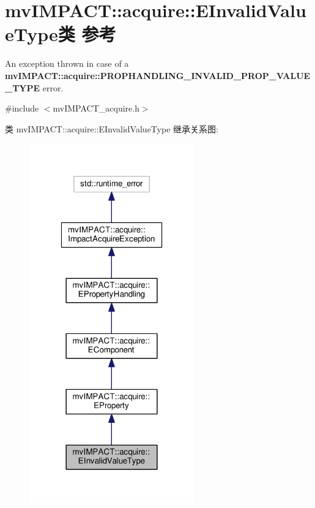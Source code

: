\hypertarget{classmv_i_m_p_a_c_t_1_1acquire_1_1_e_invalid_value_type}{\section{mv\+I\+M\+P\+A\+C\+T\+:\+:acquire\+:\+:E\+Invalid\+Value\+Type类 参考}
\label{classmv_i_m_p_a_c_t_1_1acquire_1_1_e_invalid_value_type}
}


An exception thrown in case of a {\bfseries mv\+I\+M\+P\+A\+C\+T\+::acquire\+::\+P\+R\+O\+P\+H\+A\+N\+D\+L\+I\+N\+G\+\_\+\+I\+N\+V\+A\+L\+I\+D\+\_\+\+P\+R\+O\+P\+\_\+\+V\+A\+L\+U\+E\+\_\+\+T\+Y\+P\+E} error.  




{\ttfamily \#include $<$mv\+I\+M\+P\+A\+C\+T\+\_\+acquire.\+h$>$}



类 mv\+I\+M\+P\+A\+C\+T\+:\+:acquire\+:\+:E\+Invalid\+Value\+Type 继承关系图\+:
\nopagebreak
\begin{figure}[H]
\begin{center}
\leavevmode
\includegraphics[width=202pt]{classmv_i_m_p_a_c_t_1_1acquire_1_1_e_invalid_value_type__inherit__graph}
\end{center}
\end{figure}


